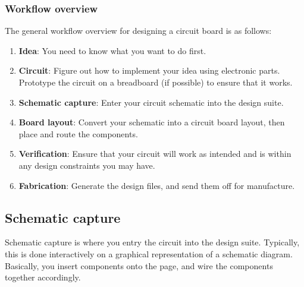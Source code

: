 \documentclass[letterpaper]{article}
\newcommand\liststyleRTFNumix{%
\renewcommand\theenumi{\arabic{enumi}}
\renewcommand\theenumii{\alph{enumii}}
\renewcommand\theenumiii{\roman{enumiii}}
\renewcommand\theenumiv{\arabic{enumiv}}
\renewcommand\labelenumi{\theenumi.}
\renewcommand\labelenumii{\theenumii.}
\renewcommand\labelenumiii{\theenumiii.}
\renewcommand\labelenumiv{\theenumiv.}
}
\begin{document}
\clearpage
\bigskip

\subsubsection{Workflow overview}
\hypertarget{Toc337742676}{}{\sffamily\color[rgb]{0.30980393,0.5058824,0.7411765}
The general workflow overview for designing a circuit board is as follows:}

\liststyleRTFNumix
\begin{enumerate}
\item {\sffamily\color[rgb]{0.30980393,0.5058824,0.7411765}
\textbf{Idea}: You need to know what you want to do first.}
\item {\sffamily\color[rgb]{0.30980393,0.5058824,0.7411765}
\textbf{Circuit}: Figure out how to implement your idea using electronic parts. Prototype the circuit on a breadboard
(if possible) to ensure that it works.}
\item {\sffamily\color[rgb]{0.30980393,0.5058824,0.7411765}
\textbf{Schematic capture}: Enter your circuit schematic into the design suite.}
\item {\sffamily\color[rgb]{0.30980393,0.5058824,0.7411765}
\textbf{Board layout}: Convert your schematic into a circuit board layout, then place and route the components.}
\item {\sffamily\color[rgb]{0.30980393,0.5058824,0.7411765}
\textbf{Verification}: Ensure that your circuit will work as intended and is within any design constraints you may
have.}
\item {\sffamily\color[rgb]{0.30980393,0.5058824,0.7411765}
\textbf{Fabrication}: Generate the design files, and send them off for manufacture.}
\end{enumerate}
\subsection{Schematic capture}
\hypertarget{Toc337742677}{}{\sffamily\color[rgb]{0.30980393,0.5058824,0.7411765}
Schematic capture is where you entry the circuit into the design suite. Typically, this is done interactively on a
graphical representation of a schematic diagram. Basically, you insert components onto the page, and wire the
components together accordingly.}


\bigskip
\end{document}
